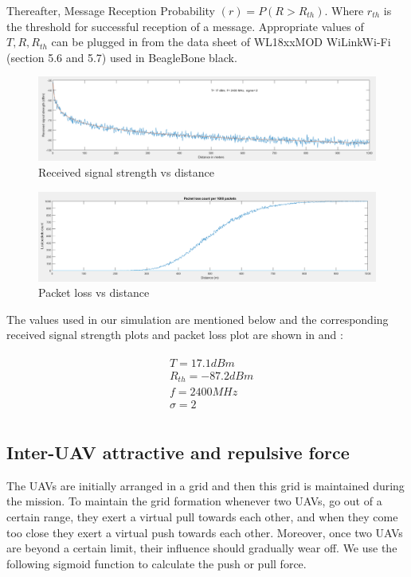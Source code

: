 Thereafter, Message Reception Probability $(r) = P(R > R_{th})$. Where $r_{th}$ is the threshold for successful reception of a message. Appropriate values of $T, R, R_{th}$ can be plugged in from the data sheet of WL18xxMOD WiLink\texttrademark Wi-Fi\textregistered   \cite{wilink} (section 5.6 and 5.7) used in BeagleBone black.

\begin{figure}[hbtp]
\centering
\includegraphics[width=1\textwidth]{ncsuthesis-0.6/Chapter-4/figs/signal_strength}
\caption{Received signal strength vs distance}
\label{fig:signal_strength}
\end{figure}
\begin{figure}[hbtp]
\centering
\includegraphics[width=1\textwidth]{ncsuthesis-0.6/Chapter-4/figs/packet_loss}
\caption{Packet loss vs distance}
\label{fig:packet_loss}
\end{figure}
The values used in our simulation are mentioned below and the corresponding received signal strength plots and packet loss plot are shown in  and :

\begin{eqnarray*}
\begin{aligned}
    & T = 17.1  dBm \\
    & R_{th} = -87.2 dBm \\ 
    & f = 2400 MHz \\
    & \sigma = 2 \\
\end{aligned}
\end{eqnarray*}


\subsection{Inter-UAV attractive and repulsive force}
The UAVs are initially arranged in a grid and then this grid is maintained during the mission. To maintain the grid formation whenever two UAVs, go out of a certain range, they exert a virtual pull towards each other, and when they come too close they exert a virtual push towards each other. Moreover, once two UAVs are beyond a certain limit, their influence should gradually wear off. We use the following sigmoid function to calculate the push or pull force. 

